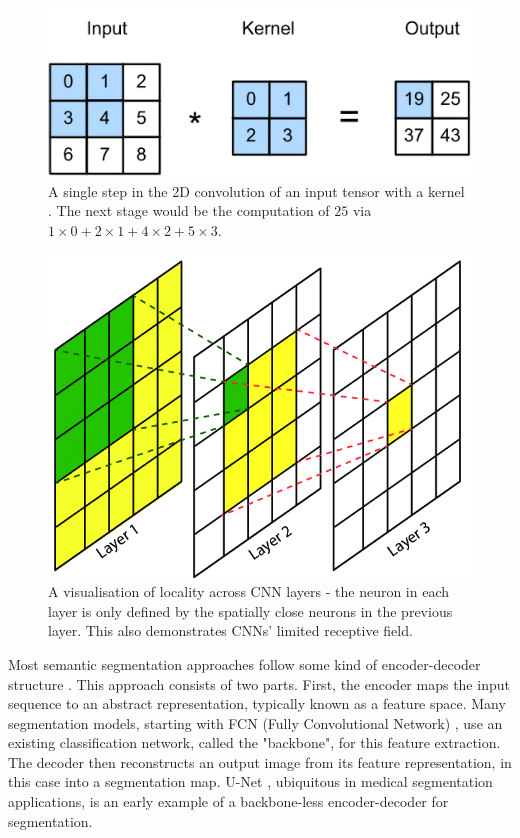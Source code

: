 \documentclass[a4paper,12pt]{report}
\begin{document}
\begin{figure}[t]
    \centering
    \includegraphics[scale=0.7]{res/convolution.png}
    \caption{A single step in the 2D convolution of an input tensor with a kernel \cite{zhang_dive_2019}. The next stage would be the computation of $25$ via $1 \times 0 + 2 \times 1 + 4 \times 2 + 5 \times 3$.}
    \label{fig:convolution}
\end{figure}

\begin{figure}[hb]
    \centering
    \includegraphics[scale=0.3]{res/receptive-field.png}
    \caption{A visualisation of locality across CNN layers \cite{lin_maritime_2017} - the neuron in each layer is only defined by the spatially close neurons in the previous layer. This also demonstrates CNNs' limited receptive field.}
    \label{fig:receptive_field}
\end{figure}

Most semantic segmentation approaches follow some kind of encoder-decoder structure \cite{zhang_dive_2019}. This approach consists of two parts. First, the encoder maps the input sequence to an abstract representation, typically known as a feature space. Many segmentation models, starting with FCN (Fully Convolutional Network) \cite{long_fully_2015}, use an existing classification network, called the "backbone", for this feature extraction. The decoder then reconstructs an output image from its feature representation, in this case into a segmentation map. U-Net \cite{ronneberger_u-net_2015}, ubiquitous in medical segmentation applications, is an early example of a backbone-less encoder-decoder for segmentation.
\end{document}
